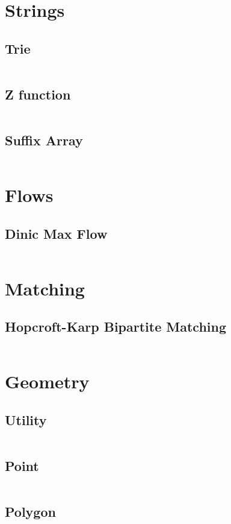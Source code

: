 \section{Strings}
  \subsection{Trie}
    \inputminted{cpp}{library/strings/trie.hpp}
  \subsection{Z function}
    \inputminted{cpp}{library/strings/z_function.hpp}
  \subsection{Suffix Array}
    \inputminted{cpp}{library/strings/suffix_array.hpp}

\section{Flows}
  \subsection{Dinic Max Flow}
    \inputminted{cpp}{library/flows/dinic.hpp}

\section{Matching}
  \subsection{Hopcroft-Karp Bipartite Matching}
    \inputminted{cpp}{library/matching/hopcroft_karp.hpp}

\section{Geometry}
  \subsection{Utility}
    \inputminted{cpp}{library/geo/geoutil.hpp}
  \subsection{Point}
    \inputminted{cpp}{library/geo/point.hpp}
  \subsection{Polygon}
    \inputminted{cpp}{library/geo/polygon.hpp}